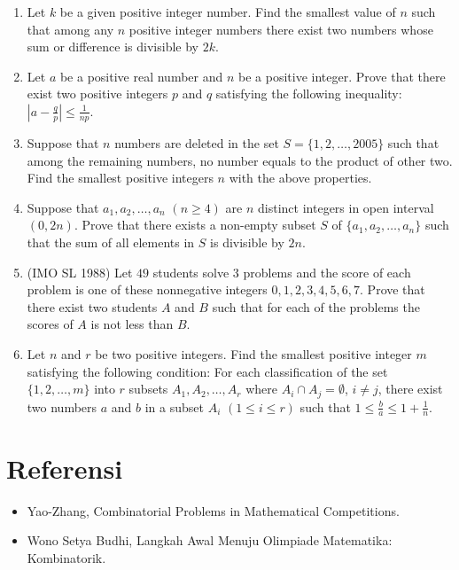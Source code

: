 \documentclass[12pt]{scrartcl}
\begin{document}
\begin{enumerate}
    \item Let $k$ be a given positive integer number. Find the smallest value of $n$ such that among any $n$ positive integer numbers there exist two numbers whose sum or difference is divisible by $2k$.
    
    \item Let $a$ be a positive real number and $n$ be a positive integer. Prove that there exist two positive integers $p$ and $q$ satisfying the following inequality: $\left|a-\frac{q}{p}\right| \le \frac{1}{np}$.
    
    \item Suppose that $n$ numbers are deleted in the set $S = \{1 ,2, \dots , 2005 \}$ such that among the remaining numbers, no number equals to the product of other two. Find the smallest positive integers $n$ with the above properties.
    
    \item Suppose that $a_1, a_2, \dots, a_n$ $(n \ge 4)$ are $n$ distinct integers in open interval $(0, 2n)$. Prove that there exists a non-empty subset $S$ of $\{a_1, a_2, \dots, a_n\}$ such that the sum of all elements in $S$ is divisible by $2n$.
    
    \item (IMO SL 1988) Let $49$ students solve $3$ problems and the score of each problem is one of these nonnegative integers $0, 1, 2, 3, 4, 5, 6, 7$. Prove that there exist two students $A$ and $B$ such that for each of the problems the scores of $A$ is not less than $B$.
    
    \item Let $n$ and $r$ be two positive integers. Find the smallest positive integer $m$ satisfying the following condition: For each classification of the set $\{1, 2, \dots, m \}$ into $r$ subsets $A_1, A_2, \dots, A_r$ where $A_i \cap A_j = \emptyset$, $i \neq j$, there exist two numbers $a$ and $b$ in a subset $A_i$ $(1 \le i \le r)$ such that $1 \le \frac{b}{a} \le 1 + \frac{1}{n}$.
\end{enumerate}

\section{Referensi}
\begin{itemize}
    \item Yao-Zhang, Combinatorial Problems in Mathematical Competitions.
    \item Wono Setya Budhi, Langkah Awal Menuju Olimpiade Matematika: Kombinatorik.
\end{itemize}
\end{document}
